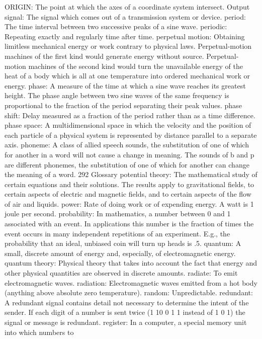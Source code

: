 {{{{{{{{{{{{{{{ORIGIN: The point at which the axes of a coordinate system intersect.
Output signal: The signal which comes out of a transmission system or
device.
period: The time interval between two successive peaks of a sine wave.
periodic: Repeating exactly and regularly time after time.
perpetual motion: Obtaining limitless mechanical energy or work contrary
to physical laws. Perpetual-motion machines of the first kind
would generate energy without source. Perpetual-motion machines
of the second kind would turn the unavailable energy of the heat
of a body which is all at one temperature into ordered mechanical
work or energy.
phase: A measure of the time at which a sine wave reaches its greatest
height. The phase angle between two sine waves of the same
frequency is proportional to the fraction of the period separating
their peak values.
phase shift: Delay measured as a fraction of the period rather than as a
time difference.
phase space: A multidimensional space in which the velocity and the
position of each particle of a physical system is represented by
distance parallel to a separate axis.
phoneme: A class of allied speech sounds, the substitution of one of which
for another in a word will not cause a change in meaning. The
sounds of b and p are different phonemes, the substitution of one
of which for another can change the meaning of a word.
292 Glossary
potential theory: The mathematical study of certain equations and their
solutions. The results apply to gravitational fields, to certain aspects
of electric and magnetic fields, and to certain aspects of the flow
of air and liquids.
power: Rate of doing work or of expending energy. A watt is 1 joule per
second.
probability: In mathematics, a number between 0 and 1 associated with
an event. In applications this number is the fraction of times the
event occurs in many independent repetitions of an experiment. E.g.,
the probability that an ideal, unbiased coin will turn up heads is .5.
quantum: A small, discrete amount of energy and, especially, of electromagnetic
energy.
quantum theory: Physical theory that takes into account the fact that
energy and other physical quantities are observed in discrete
amounts.
radiate: To emit electromagnetic waves.
radiation: Electromagnetic waves emitted from a hot body (anything
above absolute zero temperature).
random: Unpredictable.
redundant: A redundant signal contains detail not necessary to determine
the intent of the sender. If each digit of a number is sent twice
(1 10 0 1 1 instead of 1 0 1) the signal or message is redundant.
register: In a computer, a special memory unit into which numbers to
}}}}}}}}}}}}}}}
